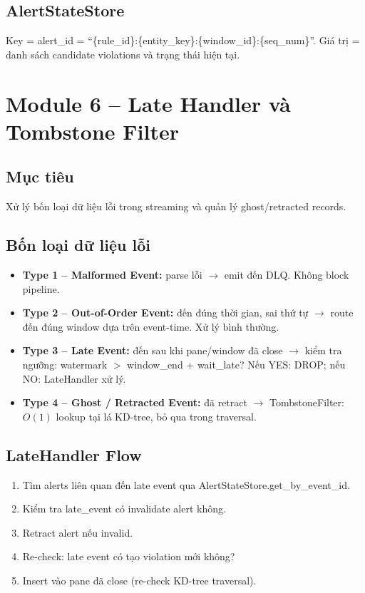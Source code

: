 \subsection{AlertStateStore}
Key = alert\_id = ``\{rule\_id\}:\{entity\_key\}:\{window\_id\}:\{seq\_num\}''. Giá trị = danh sách candidate violations và trạng thái hiện tại.

\section{Module 6 -- Late Handler và Tombstone Filter}

\subsection{Mục tiêu}
Xử lý bốn loại dữ liệu lỗi trong streaming và quản lý ghost/retracted records.

\subsection{Bốn loại dữ liệu lỗi}

\begin{itemize}
  \item \textbf{Type 1 -- Malformed Event:} parse lỗi $\rightarrow$ emit đến DLQ. Không block pipeline.
  \item \textbf{Type 2 -- Out-of-Order Event:} đến đúng thời gian, sai thứ tự $\rightarrow$ route đến đúng window dựa trên event-time. Xử lý bình thường.
  \item \textbf{Type 3 -- Late Event:} đến sau khi pane/window đã close $\rightarrow$ kiểm tra ngưỡng: watermark $>$ window\_end + wait\_late? Nếu YES: DROP; nếu NO: LateHandler xử lý.
  \item \textbf{Type 4 -- Ghost / Retracted Event:} đã retract $\rightarrow$ TombstoneFilter: $O(1)$ lookup tại lá KD-tree, bỏ qua trong traversal.
\end{itemize}

\subsection{LateHandler Flow}
\begin{enumerate}
  \item Tìm alerts liên quan đến late event qua AlertStateStore.get\_by\_event\_id.
  \item Kiểm tra late\_event có invalidate alert không.
  \item Retract alert nếu invalid.
  \item Re-check: late event có tạo violation mới không?
  \item Insert vào pane đã close (re-check KD-tree traversal).
\end{enumerate}

